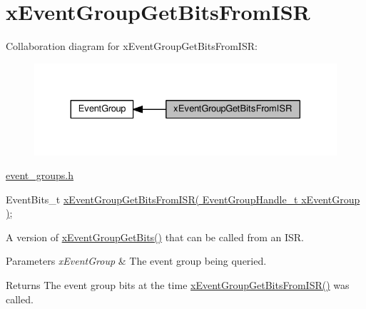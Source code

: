 \hypertarget{group__xEventGroupGetBitsFromISR}{}\section{x\+Event\+Group\+Get\+Bits\+From\+I\+SR}
\label{group__xEventGroupGetBitsFromISR}
Collaboration diagram for x\+Event\+Group\+Get\+Bits\+From\+I\+SR\+:\nopagebreak
\begin{figure}[H]
\begin{center}
\leavevmode
\includegraphics[width=330pt]{d4/d99/group__xEventGroupGetBitsFromISR}
\end{center}
\end{figure}
\hyperlink{event__groups_8h}{event\+\_\+groups.\+h} 
\begin{DoxyPre}
   EventBits\_t \hyperlink{event__groups_8h_a95822db4357d0b77c35aed0c7427eca0}{xEventGroupGetBitsFromISR( EventGroupHandle\_t xEventGroup )};
\end{DoxyPre}


A version of \hyperlink{event__groups_8h_a0ae86f092fb07ccb475ae938f9a12584}{x\+Event\+Group\+Get\+Bits()} that can be called from an I\+SR.


\begin{DoxyParams}{Parameters}
{\em x\+Event\+Group} & The event group being queried.\\
\hline
\end{DoxyParams}
\begin{DoxyReturn}{Returns}
The event group bits at the time \hyperlink{event__groups_8h_a95822db4357d0b77c35aed0c7427eca0}{x\+Event\+Group\+Get\+Bits\+From\+I\+S\+R()} was called. 
\end{DoxyReturn}
